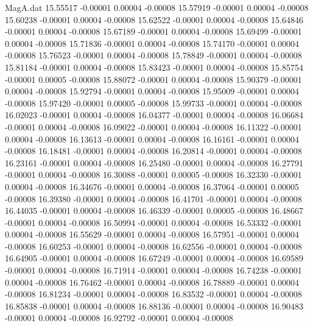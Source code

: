 \begin{filecontents}{MagA.dat}
  15.55517   -0.00001    0.00004   -0.00008
  15.57919   -0.00001    0.00004   -0.00008
  15.60238   -0.00001    0.00004   -0.00008
  15.62522   -0.00001    0.00004   -0.00008
  15.64846   -0.00001    0.00004   -0.00008
  15.67189   -0.00001    0.00004   -0.00008
  15.69499   -0.00001    0.00004   -0.00008
  15.71836   -0.00001    0.00004   -0.00008
  15.74170   -0.00001    0.00004   -0.00008
  15.76523   -0.00001    0.00004   -0.00008
  15.78849   -0.00001    0.00004   -0.00008
  15.81184   -0.00001    0.00004   -0.00008
  15.83423   -0.00001    0.00004   -0.00008
  15.85754   -0.00001    0.00005   -0.00008
  15.88072   -0.00001    0.00004   -0.00008
  15.90379   -0.00001    0.00004   -0.00008
  15.92794   -0.00001    0.00004   -0.00008
  15.95009   -0.00001    0.00004   -0.00008
  15.97420   -0.00001    0.00005   -0.00008
  15.99733   -0.00001    0.00004   -0.00008
  16.02023   -0.00001    0.00004   -0.00008
  16.04377   -0.00001    0.00004   -0.00008
  16.06684   -0.00001    0.00004   -0.00008
  16.09022   -0.00001    0.00004   -0.00008
  16.11322   -0.00001    0.00004   -0.00008
  16.13613   -0.00001    0.00004   -0.00008
  16.16161   -0.00001    0.00004   -0.00008
  16.18481   -0.00001    0.00004   -0.00008
  16.20814   -0.00001    0.00004   -0.00008
  16.23161   -0.00001    0.00004   -0.00008
  16.25480   -0.00001    0.00004   -0.00008
  16.27791   -0.00001    0.00004   -0.00008
  16.30088   -0.00001    0.00005   -0.00008
  16.32330   -0.00001    0.00004   -0.00008
  16.34676   -0.00001    0.00004   -0.00008
  16.37064   -0.00001    0.00005   -0.00008
  16.39380   -0.00001    0.00004   -0.00008
  16.41701   -0.00001    0.00004   -0.00008
  16.44035   -0.00001    0.00004   -0.00008
  16.46339   -0.00001    0.00005   -0.00008
  16.48667   -0.00001    0.00004   -0.00008
  16.50994   -0.00001    0.00004   -0.00008
  16.53332   -0.00001    0.00004   -0.00008
  16.55629   -0.00001    0.00004   -0.00008
  16.57951   -0.00001    0.00004   -0.00008
  16.60253   -0.00001    0.00004   -0.00008
  16.62556   -0.00001    0.00004   -0.00008
  16.64905   -0.00001    0.00004   -0.00008
  16.67249   -0.00001    0.00004   -0.00008
  16.69589   -0.00001    0.00004   -0.00008
  16.71914   -0.00001    0.00004   -0.00008
  16.74238   -0.00001    0.00004   -0.00008
  16.76462   -0.00001    0.00004   -0.00008
  16.78889   -0.00001    0.00004   -0.00008
  16.81234   -0.00001    0.00004   -0.00008
  16.83532   -0.00001    0.00004   -0.00008
  16.85838   -0.00001    0.00004   -0.00008
  16.88136   -0.00001    0.00004   -0.00008
  16.90483   -0.00001    0.00004   -0.00008
  16.92792   -0.00001    0.00004   -0.00008

\end{filecontents}
